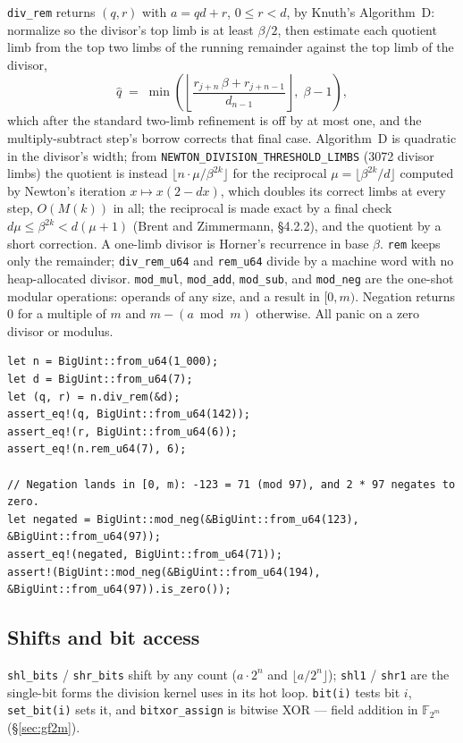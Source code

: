 \documentclass[11pt]{article}
\newcommand{\code}[1]{\texttt{#1}}
\newcommand{\F}{\mathbb{F}}
\begin{document}
\code{div\_rem} returns $(q, r)$ with $a = qd + r$, $0 \le r < d$, by
Knuth's Algorithm~D: normalize so the divisor's top limb is at least
$\beta/2$, then estimate each quotient limb from the top two limbs of the
running remainder against the top limb of the divisor,
\begin{equation}
\hat q \;=\;
\min\!\left(\left\lfloor \frac{r_{j+n}\,\beta + r_{j+n-1}}{d_{n-1}} \right\rfloor,\;
\beta - 1\right),
\end{equation}
which after the standard two-limb refinement is off by at most one, and the
multiply-subtract step's borrow corrects that final case. Algorithm~D is
quadratic in the divisor's width; from
\code{NEWTON\_DIVISION\_THRESHOLD\_LIMBS} (3072 divisor limbs) the quotient
is instead $\lfloor n \cdot \mu / \beta^{2k} \rfloor$ for the reciprocal
$\mu = \lfloor \beta^{2k} / d \rfloor$ computed by Newton's iteration
$x \mapsto x(2 - dx)$, which doubles its correct limbs at every step, $O(M(k))$
in all; the reciprocal is made exact by a final check
$d\mu \le \beta^{2k} < d(\mu + 1)$ (Brent and Zimmermann, \S4.2.2), and the
quotient by a short correction. A one-limb divisor is Horner's recurrence
in base $\beta$. \code{rem}
keeps only the remainder; \code{div\_rem\_u64} and \code{rem\_u64} divide by
a machine word with no heap-allocated divisor. \code{mod\_mul},
\code{mod\_add}, \code{mod\_sub}, and \code{mod\_neg} are the one-shot
modular operations: operands of any size, and a result in $[0, m)$.
Negation returns $0$ for a multiple of $m$ and $m - (a \bmod m)$ otherwise.
All panic on a zero divisor or modulus.

\begin{lstlisting}
let n = BigUint::from_u64(1_000);
let d = BigUint::from_u64(7);
let (q, r) = n.div_rem(&d);
assert_eq!(q, BigUint::from_u64(142));
assert_eq!(r, BigUint::from_u64(6));
assert_eq!(n.rem_u64(7), 6);

// Negation lands in [0, m): -123 = 71 (mod 97), and 2 * 97 negates to zero.
let negated = BigUint::mod_neg(&BigUint::from_u64(123), &BigUint::from_u64(97));
assert_eq!(negated, BigUint::from_u64(71));
assert!(BigUint::mod_neg(&BigUint::from_u64(194), &BigUint::from_u64(97)).is_zero());
\end{lstlisting}

\subsection{Shifts and bit access}

\code{shl\_bits} / \code{shr\_bits} shift by any count ($a \cdot 2^n$ and
$\lfloor a / 2^n \rfloor$); \code{shl1} / \code{shr1} are the single-bit
forms the division kernel uses in its hot loop. \code{bit(i)} tests bit
$i$, \code{set\_bit(i)} sets it, and \code{bitxor\_assign} is bitwise XOR
--- field addition in $\F_{2^m}$ (\S\ref{sec:gf2m}).
\end{document}
